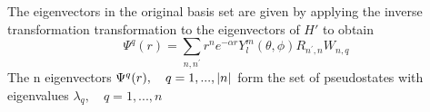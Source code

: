 The eigenvectors in the original basis set are given by applying the inverse transformation transformation to the eigenvectors of $H'$ to obtain
\begin{equation}
    \Psi^{q}(r)=
    \sum_{n,n^{\prime}}r^{n}e^{-\alpha r}Y_{l}^{m}(\theta,\phi)R_{n^{\prime},n}W_{n,q}
\end{equation}
The n eigenvectors $ \Psi^{q}(r), \quad q=1,...,\abs{n}$ form the set of pseudostates with eigenvalues $\lambda_q, \quad q=1,...,n$















